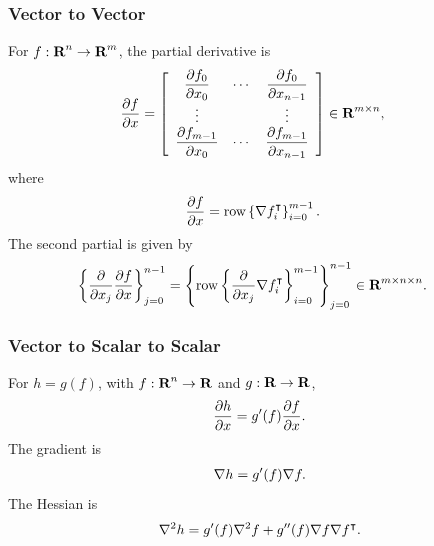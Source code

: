 \documentclass{article}
\begin{document}
    \subsubsection{Vector to Vector}
        For $f:\textbf{R}^n\to\textbf{R}^m$, the partial derivative is
        \begin{align*}
            \frac{\partial f}{\partial x}&=\left[\begin{array}{ccc}
            \dfrac{\partial f_0}{\partial x_0} & \cdots & \dfrac{\partial f_0}{\partial x_{n-1}}\\
            \vdots & & \vdots\\
            \dfrac{\partial f_{m-1}}{\partial x_0} & \cdots & \dfrac{\partial f_{m-1}}{\partial x_{n-1}}
            \end{array}\right]\in\textbf{R}^{m\times n},
        \end{align*}
        where
        \begin{align*}
            \frac{\partial f}{\partial x}&=\text{row}\left\{\nabla f_i^\intercal\right\}_{i=0}^{m-1}.
        \end{align*}
        The second partial is given by
        \begin{align*}
            \left\{\frac{\partial }{\partial x_j}\frac{\partial f}{\partial x}\right\}_{j=0}^{n-1}
            &=\left\{\text{row}\left\{\frac{\partial }{\partial x_j}\nabla f_i^\intercal\right\}_{i=0}^{m-1}\right\}_{j=0}^{n-1}\in\textbf{R}^{m\times n\times n}.
        \end{align*}
    
        \subsubsection{Vector to Scalar to Scalar}
        For $h=g(f)$, with $f:\textbf{R}^n\to\textbf{R}$ and $g:\textbf{R}\to\textbf{R}$,
        \begin{align*}
            \frac{\partial h}{\partial x}=g'(f)\frac{\partial f}{\partial x}.
        \end{align*}
        The gradient is 
        \begin{align*}
            \nabla h = g'(f) \nabla f.
        \end{align*}
        The Hessian is 
        \begin{align*}
            \nabla^2 h = g'(f)\nabla^2f+g''(f)\nabla f\nabla f^\intercal.
        \end{align*}
    
\end{document}
